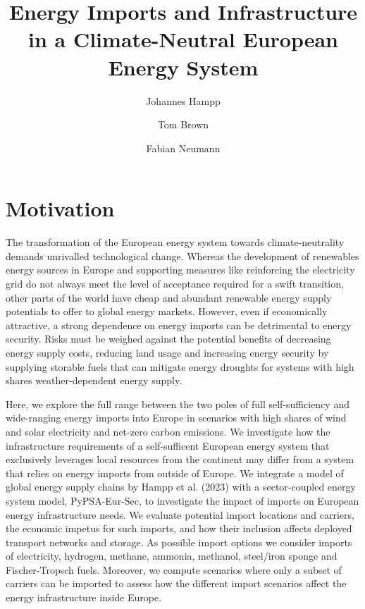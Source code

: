 \documentclass[10pt,5p,reversenotenum,lefttitle]{elsarticle}
\begin{document}
\begin{frontmatter}

	\title{Energy Imports and Infrastructure in a Climate-Neutral European Energy System}
    
	\author[jlu]{Johannes Hampp}
    \author[tub]{Tom Brown}
	\author[tub]{Fabian Neumann}
	\address[jlu]{Center for International Development and Environmental Research, Justus-Liebig-University Gießen, Gießen, Germany}
	\address[tub]{Department of Digital Transformation in Energy Systems, Institute of Energy Technology, Technische Universität Berlin, Fakultät III, Einsteinufer 25 (TA 8), 10587 Berlin, Germany}

\end{frontmatter}

\section*{Motivation}

The transformation of the European energy system towards climate-neutrality
demands unrivalled technological change. Whereas the development of renewables
energy sources in Europe and supporting measures like reinforcing the
electricity grid do not always meet the level of acceptance required for a swift
transition, other parts of the world have cheap and abundant renewable energy
supply potentials to offer to global energy markets. However, even if
economically attractive, a strong dependence on energy imports can be
detrimental to energy security. Risks must be weighed against the potential
benefits of decreasing energy supply costs, reducing land usage and increasing
energy security by supplying storable fuels that can mitigate energy droughts
for systems with high shares weather-dependent energy supply.

Here, we explore the full range between the two poles of full self-sufficiency
and wide-ranging energy imports into Europe in scenarios with high shares of
wind and solar electricity and net-zero carbon emissions. We investigate how the
infrastructure requirements of a self-sufficent European energy system that
exclusively leverages local resources from the continent may differ from a
system that relies on energy imports from outside of Europe. We integrate a
model of global energy supply chains by Hampp et al. (2023) with a
sector-coupled energy system model, PyPSA-Eur-Sec, to investigate the impact of
imports on European energy infrastructure needs. We evaluate potential import
locations and carriers, the economic impetus for such imports, and how their
inclusion affects deployed transport networks and storage. As possible import
options we consider imports of electricity, hydrogen, methane, ammonia,
methanol, steel/iron sponge and Fischer-Tropsch fuels. Moreover, we compute
scenarios where only a subset of carriers can be imported to assess how the
different import scenarios affect the energy infrastructure inside Europe.
\end{document}
